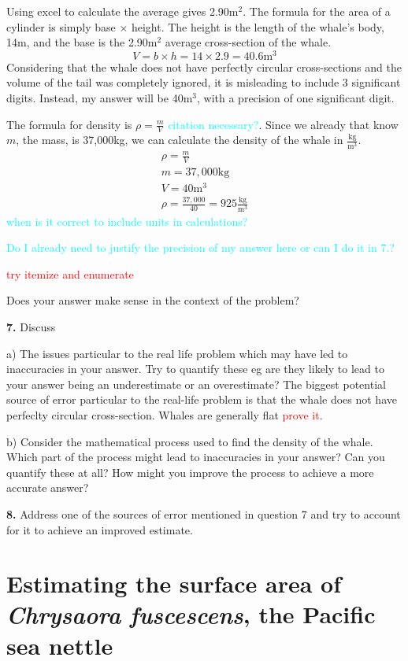 \documentclass[fleqn]{article}
\newcommand{\unit}[1]{\ensuremath{\mathrm{#1}}}
\newcommand\todo[1]{\textcolor{red}{#1}}
\newcommand\ask[1]{\textcolor{cyan}{#1}}
\newcommand\chry{\textit{Chrysaora fuscescens}}
\begin{document}
Using excel to calculate the average gives 2.90m$^{2}$. The formula for the area of a cylinder is simply base $\times$ height. The height is the length of the whale's body, 14m, and the base is the 2.90m$^2$ average cross-section of the whale.
\[
V = b \times h = 14 \times 2.9 = 40.6 \unit{m^{3}}
\]
Considering that the whale does not have perfectly circular cross-sections and the volume of the tail was completely ignored, it is misleading to include 3 significant digits. Instead, my answer will be 40m$^3$, with a precision of one significant digit.

The formula for density is $\rho = \frac{m}{V}$ \ask{citation necessary?}. Since we already that know $m$, the mass, is 37,000kg, we can calculate the density of the whale in $\frac{\unit{kg}}{\unit{m^3}}$.
\begin{gather*}
  \rho = \frac{m}{V} \\
  m = 37,000\unit{kg} \\
  V = 40\unit{m^3} \\
  \rho = \frac{37,000}{40} = 925\frac{\unit{kg}}{\unit{m^3}}
\end{gather*}
\ask{when is it correct to include units in calculations?}

\ask{Do I already need to justify the precision of my answer here or can I do it in 7.?}

\todo{try itemize and enumerate}

Does your answer make sense in the context of the problem?

\textbf{7.}	Discuss 

a) The issues particular to the real life problem which may have led to inaccuracies in your answer.  Try to quantify these eg are they likely to lead to your answer being an underestimate or an overestimate?
The biggest potential source of error particular to the real-life problem is that the whale does not have perfeclty circular cross-section. Whales are generally flat \todo{prove it}.

b) Consider the mathematical process used to find the density of the whale.  Which part of the process might lead to inaccuracies in your answer?  Can you quantify these at all?  How might you improve the process to achieve a more accurate answer?

\textbf{8.}	Address one of the sources of error mentioned in question 7 and try to account for it to achieve an improved estimate.


\section{Estimating the surface area of \chry, the Pacific sea nettle}
\end{document}
